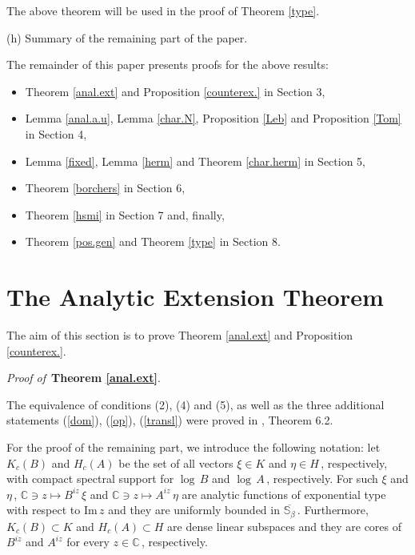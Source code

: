 \documentclass[reqno]{amsart}
\theoremstyle{definition}
\theoremstyle{remark}
\numberwithin{equation}{section}
\theoremstyle{plain}
\begin{document}
The above theorem will be used in the proof of Theorem \ref{type}.

\bigskip
\noindent (h) {\sc Summary of the remaining part of the paper}.
\bigskip

The remainder of this paper presents proofs for the above results:
\begin{itemize}
\item[--] Theorem \ref{anal.ext} and Proposition \ref{counterex.}
in Section 3,
\item[--] Lemma \ref{anal.a.u}, Lemma \ref{char.N},
Proposition \ref{Leb} and Proposition \ref{Tom} in Section 4,
\item[--] Lemma \ref{fixed}, Lemma \ref{herm} and Theorem
\ref{char.herm} in Section 5,
\item[--] Theorem \ref{borchers} in Section 6,
\item[--] Theorem \ref{hsmi} in Section 7 and, finally,
\item[--] Theorem \ref{pos.gen}
and Theorem \ref{type} in Section 8.
\end{itemize}

\bigskip
\section{The Analytic Extension Theorem}
\bigskip

The aim of this section is to prove Theorem \ref{anal.ext} and
Proposition \ref{counterex.}.
\medskip

{\it Proof of }$\,${\bf Theorem \ref{anal.ext}}.
\medskip

The equivalence of conditions (2), (4) and (5), as well as the
three additional statements (\ref{dom}), (\ref{op}), (\ref{transl})
were proved in \cite{C-Z}, Theorem 6.2.

For the proof of the remaining part, we introduce the following
notation: let $K_c(B)$ and $H_c(A)$ be the set of all vectors
$\xi\in K$ and $\eta\in H\,$, respectively, with compact spectral
support for $\log\, B$ and $\log\, A\,$, respectively. For such $\xi$
and $\eta\,$, $\mathbb C\ni z\longmapsto B^{iz}\,\xi$ and
$\mathbb C\ni z\longmapsto A^{iz}\,\eta$ are analytic functions of
exponential type with respect to Im$\, z$ and they are uniformly
bounded in $\overline{\mathbb S_\beta}\,$. Furthermore,
$K_c(B)\subset K$ and $H_c(A)\subset H$ are dense linear subspaces
and they are cores of $B^{iz}$ and $A^{iz}$ for every
$z\in\mathbb C\,$, respectively.
\medskip
\end{document}
